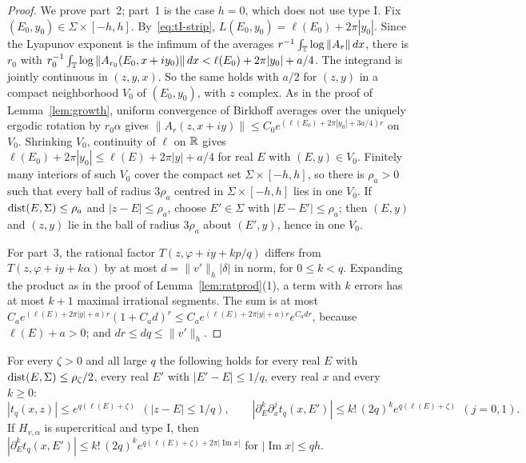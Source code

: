\begin{proof}
We prove part~2; part~1 is the case $h=0$, which does not use type I. Fix $(E_0,y_0)\in\Sigma\times[-h,h]$. By~\eqref{eq:tI-strip}, $L(E_0,y_0)=\ell(E_0)+2\pi|y_0|$. Since the Lyapunov exponent is the infimum of the averages $r^{-1}\int_\mathbb T\log\|A_r\|\,dx$, there is $r_0$ with $r_0^{-1}\int_\mathbb T\log\|A_{r_0}(E_0,x+iy_0)\|\,dx<\ell(E_0)+2\pi|y_0|+a/4$. The integrand is jointly continuous in $(z,y,x)$. So the same holds with $a/2$ for $(z,y)$ in a compact neighborhood $V_0$ of $(E_0,y_0)$, with $z$ complex. As in the proof of Lemma~\ref{lem:growth}, uniform convergence of Birkhoff averages over the uniquely ergodic rotation by $r_0\alpha$ gives $\|A_r(z,x+iy)\|\le C_0e^{(\ell(E_0)+2\pi|y_0|+3a/4)r}$ on $V_0$. Shrinking $V_0$, continuity of $\ell$ on $\mathbb R$ gives $\ell(E_0)+2\pi|y_0|\le\ell(E)+2\pi|y|+a/4$ for real $E$ with $(E,y)\in V_0$. Finitely many interiors of such $V_0$ cover the compact set $\Sigma\times[-h,h]$, so there is $\rho_a>0$ such that every ball of radius $3\rho_a$ centred in $\Sigma\times[-h,h]$ lies in one $V_0$. If $\operatorname{dist}(E,\Sigma)\le\rho_a$ and $|z-E|\le\rho_a$, choose $E'\in\Sigma$ with $|E-E'|\le\rho_a$; then $(E,y)$ and $(z,y)$ lie in the ball of radius $3\rho_a$ about $(E',y)$, hence in one $V_0$.

For part~3, the rational factor $T(z,\varphi+iy+kp/q)$ differs from $T(z,\varphi+iy+k\alpha)$ by at most $d=\|v'\|_h|\delta|$ in norm, for $0\le k<q$. Expanding the product as in the proof of Lemma~\ref{lem:ratprod}(1), a term with $k$ errors has at most $k+1$ maximal irrational segments. The sum is at most $C_ae^{(\ell(E)+2\pi|y|+a)r}(1+C_ad)^r\le C_ae^{(\ell(E)+2\pi|y|+a)r}e^{C_adr}$, because $\ell(E)+a>0$; and $dr\le dq\le\|v'\|_h$.
\end{proof}

\begin{corollary}\label{cor:tI-bounds}
For every $\zeta>0$ and all large $q$ the following holds for every real $E$ with $\operatorname{dist}(E,\Sigma)\le\rho_\zeta/2$, every real $E'$ with $|E'-E|\le1/q$, every real $x$ and every $k\ge0$:
\[
|t_q(x,z)|\le e^{q(\ell(E)+\zeta)}\ \ (|z-E|\le 1/q),\qquad
|\partial_E^k\partial_x^jt_q(x,E')|\le k!\,(2q)^ke^{q(\ell(E)+\zeta)}\ \ (j=0,1).
\]
If $H_{v,\alpha}$ is supercritical and type I, then $|\partial_E^kt_q(x,E')|\le k!\,(2q)^ke^{q(\ell(E)+\zeta)+2\pi|\operatorname{Im}x|}$ for $|\operatorname{Im}x|\le qh$.
\end{corollary}

